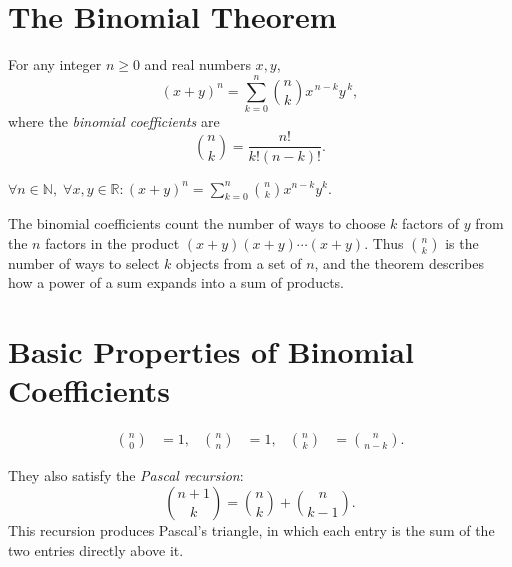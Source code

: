 
\section{The Binomial Theorem}
\label{sec:binomial-theorem}

\begin{tcolorbox}[colback=thmbox, colframe=thmborder, arc=2pt,
  left=6pt, right=6pt, top=4pt, bottom=4pt,
  title={\small\textbf{Theorem (Binomial Theorem)}},
  fonttitle=\small\bfseries]
For any integer \(n \ge 0\) and real numbers \(x,y\),
\[
(x+y)^n
=
\sum_{k=0}^{n} \binom{n}{k} x^{\,n-k} y^{\,k},
\]
where the \emph{binomial coefficients} are
\[
\binom{n}{k}
=
\frac{n!}{k!(n-k)!}.
\]
\end{tcolorbox}
\label{thm:binomial}

\begin{remark*}
\(\forall n \in \mathbb{N},\; \forall x,y \in \mathbb{R}: \displaystyle(x+y)^n = \sum_{k=0}^{n}\binom{n}{k}x^{n-k}y^{k}\).
\end{remark*}

\begin{remark*}
The binomial coefficients count the number of ways to choose \(k\) factors of
\(y\) from the \(n\) factors in the product \((x+y)(x+y)\cdots(x+y)\).
Thus \(\binom{n}{k}\) is the number of ways to select \(k\) objects from a
set of \(n\), and the theorem describes how a power of a sum expands into
a sum of products.
\end{remark*}

\section*{Basic Properties of Binomial Coefficients}

\begin{align*}
\binom{n}{0} &= 1, &
\binom{n}{n} &= 1, &
\binom{n}{k} &= \binom{n}{n-k}.
\end{align*}

They also satisfy the \emph{Pascal recursion}:
\[
\binom{n+1}{k}
=
\binom{n}{k}+\binom{n}{k-1}.
\]
This recursion produces Pascal's triangle, in which each entry is the
sum of the two entries directly above it.

\begin{center}
\end{center}

